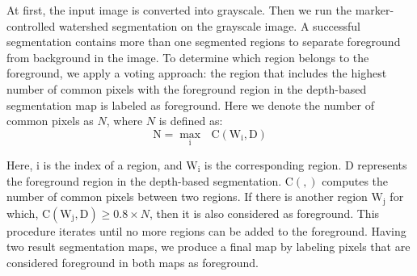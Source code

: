 	At first, the input image is converted into grayscale. Then we run the marker-controlled watershed segmentation on the grayscale image. A successful segmentation contains more than one segmented regions to separate foreground from background in the image. To determine which region belongs to the foreground, we apply a voting approach: the region that includes the highest number of common pixels with the foreground region in the depth-based segmentation map is labeled as foreground. Here we denote the number of common pixels as $N$, where $N$ is defined as:
	\begin{equation}
		\mathrm{N = \max_i\mbox{ }C(W_i, D)}
	\end{equation}

	Here, $\mathrm{i}$ is the index of a region, and $\mathrm{W_i}$ is the corresponding region. $\mathrm{D}$ represents the foreground region in the depth-based segmentation. $\mathrm{C(,)}$ computes the number of common pixels between two regions. If there is another region $\mathrm{W_j}$ for which, $\mathrm{C(W_j,D)} \ge 0.8 \times N$, then it is also considered as foreground. This procedure iterates until no more regions can be added to the foreground. Having two result segmentation maps, we produce a final map by labeling pixels that are considered foreground in both maps as foreground.


	\vspace{.5em}





